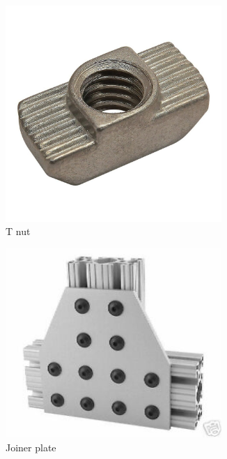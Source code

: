 \documentclass[10pt,letterpaper]{book}
\begin{document}
	\begin{figure}[H]
	\begin{subfigure}[b]{.32\linewidth}
		\includegraphics[width=0.9\textwidth]{imgs/tradition_8020_tnut.jpeg}
		\caption{T nut}
	\end{subfigure}\begin{subfigure}[b]{.32\linewidth}
		\includegraphics[width=0.9\textwidth]{imgs/tradition_8020_ext_plate.jpeg}
		\caption{Joiner plate}
	\end{subfigure}\begin{subfigure}[b]{.32\linewidth}

\end{subfigure}
\end{figure}
\end{document}
